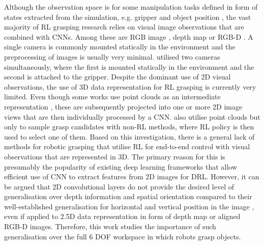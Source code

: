 Although the observation space is for some manipulation tasks defined in form of states extracted from the simulation, e.g. gripper and object position \cite{popov_data-efficient_2017, haarnoja_composable_2018}, the vast majority of RL grasping research relies on visual image observations that are combined with CNNs. Among these are RGB image \cite{tobin_domain_2017, kalashnikov_qt-opt_2018, quillen_deep_2018, kim_acceleration_2020, iqbal_toward_2020}, depth map \cite{gualtieri_learning_2018, breyer_comparing_2019, wu_generative_2020} or RGB-D \cite{zeng_learning_2018, liu_active_2019, daniel_deep_2020}. A single camera is commonly mounted statically in the environment and the preprocessing of images is usually very minimal. \citet{zhan_framework_2020, joshi_robotic_2020} utilised two cameras simultaneously, where the first is mounted statically in the environment and the second is attached to the gripper. Despite the dominant use of 2D visual observations, the use of 3D data representation for RL grasping is currently very limited. Even though some works use point clouds as an intermediate representation \cite{zeng_learning_2018, gualtieri_learning_2018}, these are subsequently projected into one or more 2D image views that are then individually processed by a CNN. \citet{osa_experiments_2017, gualtieri_pick_2018} also utilise point clouds but only to sample grasp candidates with non-RL methods, where RL policy is then used to select one of them. Based on this investigation, there is a general lack of methods for robotic grasping that utilise RL for end-to-end control with visual observations that are represented in 3D. The primary reason for this is presumably the popularity of existing deep learning frameworks that allow efficient use of CNN to extract features from 2D images for DRL. However, it can be argued that 2D convolutional layers do not provide the desired level of generalisation over depth information and spatial orientation compared to their well-established generalisation for horizontal and vertical position in the image \cite{gualtieri_pick_2018}, even if applied to 2.5D data representation in form of depth map or aligned RGB-D images. Therefore, this work studies the importance of such generalisation over the full 6 DOF workspace in which robots grasp objects.

